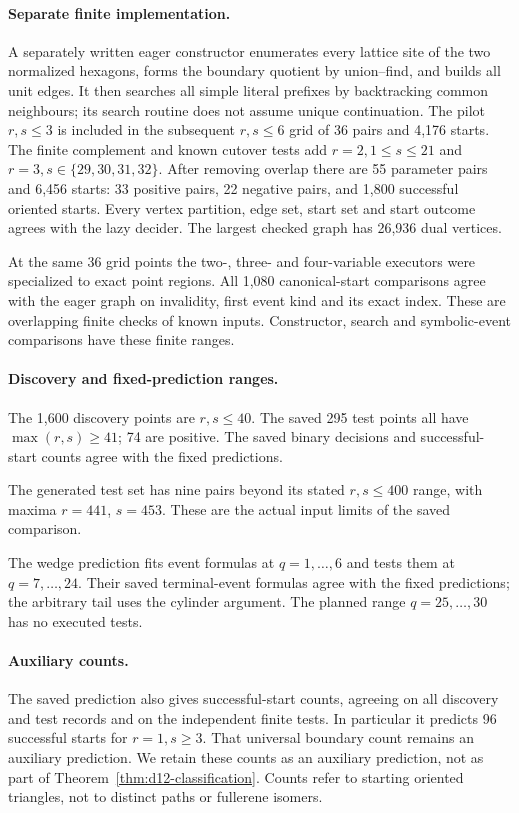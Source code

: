 \documentclass[11pt]{amsart}
\newcommand{\claimid}[1]{}
\theoremstyle{definition}\newtheorem{definition}[theorem]{Definition}
\begin{document}
\paragraph{Separate finite implementation.}\label{prop:independent-finite}
A separately written eager constructor enumerates every lattice site
of the two normalized hexagons, forms the boundary quotient by
union--find, and builds all unit edges. It then searches all simple
literal prefixes by backtracking common neighbours; its search routine
does not assume unique continuation. The pilot $r,s\le3$ is included
in the subsequent $r,s\le6$ grid of 36 pairs and 4,176 starts.
The finite complement and known cutover tests add $r=2,1\le s\le21$
and $r=3,s\in\{29,30,31,32\}$. After removing overlap there are
55 parameter pairs and 6,456 starts: 33 positive pairs, 22 negative
pairs, and 1,800 successful oriented starts. Every vertex partition,
edge set, start set and start outcome agrees with the lazy decider.
The largest checked graph has 26,936 dual vertices.
\claimid{prop:independent-finite}

At the same 36 grid points the two-, three- and four-variable executors
were specialized to exact point regions. All 1,080 canonical-start
comparisons agree with the eager graph on invalidity, first event
kind and its exact index. These are overlapping finite checks of known
inputs. Constructor, search and symbolic-event comparisons have
these finite ranges.

\paragraph{Discovery and fixed-prediction ranges.}\label{prop:holdout}
The 1,600 discovery points are $r,s\le40$. The saved
295 test points all have $\max(r,s)\ge41$; 74 are positive. The saved binary decisions and successful-start counts agree
with the fixed predictions.
\claimid{prop:holdout}

The generated test set has nine pairs beyond its stated
$r,s\le400$ range, with maxima $r=441$, $s=453$. These are the actual
input limits of the saved comparison.

The wedge prediction fits event formulas at $q=1,\ldots,6$
and tests them at $q=7,\ldots,24$. Their saved terminal-event formulas
agree with the fixed predictions; the arbitrary tail uses the cylinder
argument. The planned range $q=25,\ldots,30$ has no executed tests.

\paragraph{Auxiliary counts.}\label{conj:start-counts}
The saved prediction also gives successful-start counts, agreeing on
all discovery and test records and on the independent finite tests.
In particular it predicts 96 successful starts for $r=1,s\ge3$.
That universal boundary count remains an auxiliary prediction.
We retain these counts as an auxiliary prediction, not as part of
Theorem~\ref{thm:d12-classification}. Counts refer to starting oriented
triangles, not to distinct paths or fullerene isomers.
\claimid{conj:start-counts}
\end{document}
